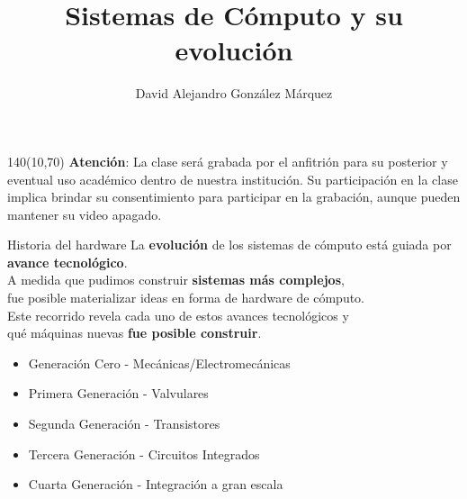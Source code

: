 \documentclass[aspectratio=169]{beamer}
\title{\Huge Sistemas de Cómputo y su evolución}
\author{David Alejandro González Márquez}
\date{}
\begin{document}
\begin{frame}[plain]
    \titlepage
    \begin{textblock}{140}(10,70)
    \textcolor{rojo}{
    \textbf{Atención}: La clase será grabada por el anfitrión para su posterior y eventual uso académico dentro de nuestra institución. Su participación en la clase implica brindar su consentimiento para participar en la grabación, aunque pueden mantener su video apagado.}
    \end{textblock}
\end{frame}


\begin{frame}[fragile,t]{Historia del hardware}
    La \textbf{evolución} de los sistemas de cómputo está guiada por \textbf{avance tecnológico}.\\
    \bigskip
    A medida que pudimos construir \textbf{sistemas más complejos},\\ fue posible materializar ideas en forma de hardware de cómputo.\\
    \bigskip
    \pause 
    Este recorrido revela cada uno de estos avances tecnológicos y\\ qué máquinas nuevas \textbf{fue posible construir}.\\
    \bigskip
    \begin{itemize}
    \item {Generación Cero} - \textcolor{verdeuca}{Mecánicas/Electromecánicas}
    \item {Primera Generación} - \textcolor{verdeuca}{Valvulares}
    \item {Segunda Generación} - \textcolor{verdeuca}{Transistores}
    \item {Tercera Generación} - \textcolor{verdeuca}{Circuitos Integrados}
    \item {Cuarta Generación} - \textcolor{verdeuca}{Integración a gran escala}
    \end{itemize}
\end{frame}
\end{document}
